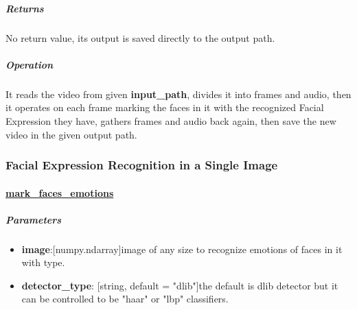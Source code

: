 \subparagraph{Returns} 
\begin{changemargin}{1cm}{0cm} 
No return value, its output is saved directly to the output path.
\end{changemargin}

\subparagraph{Operation}
\begin{changemargin}{1cm}{0cm} 
It reads the video from given \textbf{input\_path}, divides it into frames and audio, then it operates on each frame marking the faces in it with the recognized Facial Expression they have, gathers frames and audio back again, then save the new video in the given output path.
\end{changemargin}

\begin{comment}
\subparagraph{Usage:}
\begin{changemargin}{0.5cm}{0cm} 
	\begin{itemize}
		\item import the module:
		\begin{lstlisting}[language=Python]
		from Cerebro.interface Import process_video as pv\end{lstlisting}
		\item call it:
		\begin{lstlisting}[language=Python]
		pv.detect_video_emotion(video_path, output_path, skip,detector_type, verbose)\end{lstlisting}
	\end{itemize}
\end{changemargin}
\end{comment}
\hrulefill
\subsubsection{Facial Expression Recognition in a Single Image}
\paragraph{\underline{mark\_faces\_emotions}}

\subparagraph{Parameters}
\begin{changemargin}{0.5cm}{0cm}
\begin{itemize}
	\item \textbf{image}:[numpy.ndarray]image of any size to recognize emotions of faces in it with type.
	\item \textbf{detector\_type}: [string, default = "dlib"]the default is dlib detector but it can be controlled to be "haar" or "lbp" classifiers.	
\end{itemize}
\end{changemargin}

